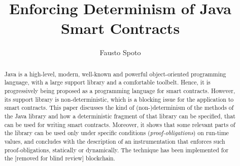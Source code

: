 \documentclass[orivec]{llncs}
\begin{document}
%
\begin{frontmatter}
\title{Enforcing Determinism of Java Smart Contracts}
\author{Fausto Spoto}
%
\maketitle
%
\begin{abstract}
  Java is a high-level, modern, well-known and powerful object-oriented programming
  language, with a large support library and a comfortable toolbelt.
  Hence, it is progressively being proposed as a programming language for
  smart contracts. However, its support library is non-deterministic,
  which is a blocking issue for the application to smart contracts.
  This paper discusses the kind of (non-)determinism of the methods
  of the Java library and how a deterministic fragment of that library can be specified,
  that can be used for writing smart contracts. Moreover, it
  shows that some relevant parts of the library can be used only under specific
  conditions (\emph{proof-obligations}) on run-time values,
  and concludes with the description of
  an instrumentation that enforces such proof-obligations, statically or dynamically.
  The technique has been implemented for the [removed for blind review] blockchain.
\end{abstract}
%
\end{frontmatter}










\end{document}
